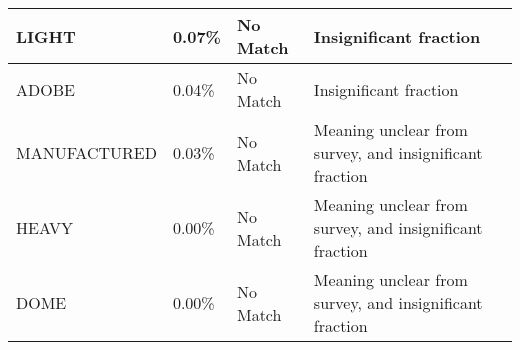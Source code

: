 \begin{table}
\begin{tabular}{|p{1.25in}|l|l|p{2in}|}
LIGHT                         & 0.07\%   & No Match    & Insignificant fraction \\ \hline
ADOBE                         & 0.04\%   & No Match    & Insignificant fraction \\ \hline
MANUFACTURED                  & 0.03\%   & No Match    & Meaning unclear from survey, and insignificant fraction \\ \hline
HEAVY                         & 0.00\%   & No Match    & Meaning unclear from survey, and insignificant fraction \\ \hline
DOME                          & 0.00\%   & No Match    & Meaning unclear from survey, and insignificant fraction \\ \hline
\end{tabular}
\end{table}